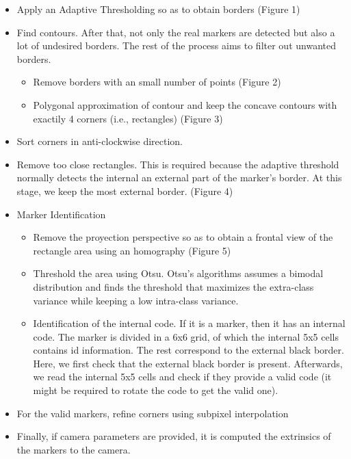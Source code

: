 \begin{itemize}
\item Apply an Adaptive Thresholding so as to obtain borders (Figure 1)
\item Find contours. After that, not only the real markers are detected but also a lot of undesired borders. The rest of the process aims to filter out unwanted borders.
\begin{itemize}
\item Remove borders with an small number of points (Figure 2)
\item Polygonal approximation of contour and keep the concave contours with exactily 4 corners (i.e., rectangles) (Figure 3)
\end{itemize}
\item Sort corners in anti-clockwise direction.
\item Remove too close rectangles. This is required because the adaptive threshold normally detects the internal an external part of the marker's border. At this stage, we keep the most external border. (Figure 4)
\item Marker Identification
\begin{itemize}
\item Remove the proyection perspective so as to obtain a frontal view of the rectangle area using an homography (Figure 5)
\item Threshold the area using Otsu. Otsu's algorithms assumes a bimodal distribution and finds the threshold that maximizes the extra-class variance while keeping a low intra-class variance.
\item Identification of the internal code. If it is a marker, then it has an internal code. The marker is divided in a 6x6 grid, of which the internal 5x5 cells contains id information. The rest correspond to the external black border. Here, we first check that the external black border is present. Afterwards, we read the internal 5x5 cells and check if they provide a valid code (it might be required to rotate the code to get the valid one).
\end{itemize}
\item For the valid markers, refine corners using subpixel interpolation
\item Finally, if camera parameters are provided, it is computed the extrinsics of the markers to the camera.
\end{itemize}







